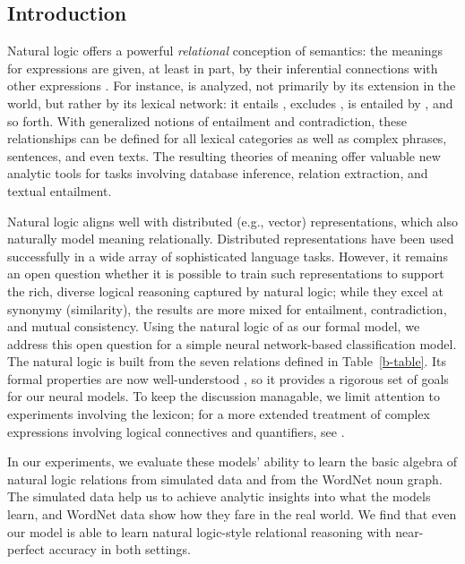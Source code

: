 \subsection*{Introduction}\label{sec:intro}

Natural logic offers a powerful \emph{relational} conception of
semantics: the meanings for expressions are given, at least in part,
by their inferential connections with other expressions
\cite{vanBenthem08NATLOG,maccartney2009extended}. For instance,
 is analyzed, not primarily by its extension in the
world, but rather by its lexical network: it entails ,
excludes , is entailed by , and so forth. With generalized notions of entailment and
contradiction, these relationships can be defined for all lexical
categories as well as complex phrases, sentences, and even texts. The
resulting theories of meaning offer valuable new analytic tools for
tasks involving database inference, relation extraction, and textual
entailment.

Natural logic aligns well with distributed (e.g., vector)
representations, which also naturally model meaning relationally.
Distributed representations have been used successfully in a wide
array of sophisticated language tasks. %
However, it remains an open question whether it is possible to train
such representations to support the rich, diverse logical reasoning
captured by natural logic; while they excel at
synonymy (similarity), the results are more mixed for entailment,
contradiction, and mutual consistency.  Using the natural logic of
\cite{maccartney2009extended} as our formal model, we address this
open question for a simple neural network-based classification model. 
The natural logic is built from the seven relations defined in
Table~\ref{b-table}. Its formal properties are now well-understood
\cite{Icard:Moss:2013:LILT}, so it provides a rigorous
set of goals for our neural models. To keep the discussion managable,
we limit attention to experiments involving the lexicon; for a more
extended treatment of complex expressions involving logical
connectives and quantifiers, see \citet{Bowman:Potts:Manning:2014}.

In our experiments, we evaluate these models' ability to learn the
basic algebra of natural logic relations from simulated data and from
the WordNet noun graph. The simulated data help us to achieve analytic
insights into what the models learn, and WordNet data show how they
fare in the real world.  We find that even our model is able to learn
natural logic-style relational reasoning with near-perfect accuracy
in both settings.

